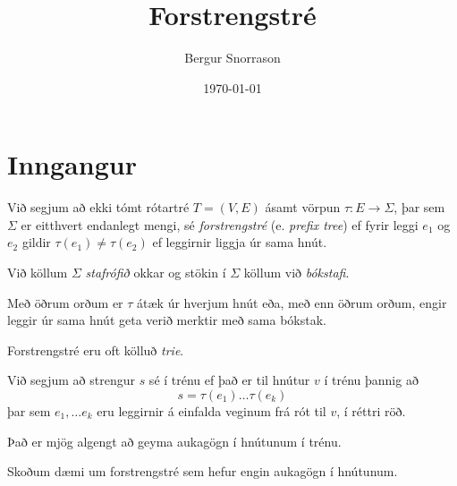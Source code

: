 \title{Forstrengstré}
\author{Bergur Snorrason}
\date{\today}



\frame{\titlepage}

\section{Inngangur}
{
    {
        \item<1-> Við segjum að ekki tómt rótartré $T = (V, E)$ ásamt vörpun $\tau \colon E \rightarrow \Sigma$,
                    þar sem $\Sigma$ er eitthvert endanlegt mengi, sé \emph{forstrengstré} (e. \emph{prefix tree})
                    ef fyrir leggi $e_1$ og $e_2$ gildir $\tau(e_1) \neq \tau(e_2)$ ef leggirnir liggja úr sama hnút.
        \item<2-> Við köllum $\Sigma$ \emph{stafrófið} okkar og stökin í $\Sigma$ köllum við \emph{bókstafi}.
        \item<3-> Með öðrum orðum er $\tau$ átæk úr hverjum hnút eða, með enn öðrum orðum, engir leggir úr sama hnút geta verið merktir með sama bókstak.
        \item<4-> Forstrengstré eru oft kölluð \emph{trie}.
        \item<5-> Við segjum að strengur $s$ sé í trénu ef það er til hnútur $v$ í trénu þannig að
        \[
            s = \tau(e_1) \dots \tau(e_k)
        \]
                    þar sem $e_1, \dots e_k$ eru leggirnir á einfalda veginum frá rót til $v$, í réttri röð.
        \item<6-> Það er mjög algengt að geyma aukagögn í hnútunum í trénu.
        \item<7-> Skoðum dæmi um forstrengstré sem hefur engin aukagögn í hnútunum.
    }
}

